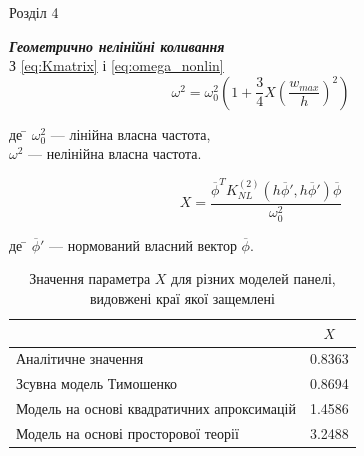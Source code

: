 \documentclass[8pt]{beamer}
\numberwithin{figure}{section}
\numberwithin{equation}{section}
\numberwithin{table}{section}
\begin{document}
\begin{frame}{Розділ 4}

\textbf{\textit{Геометрично нелінійні коливання}}
\\
\vspace{1em}
З \eqref{eq:Kmatrix} і \eqref{eq:omega_nonlin}
\begin{equation}
\omega^2=\omega_0^2\left(1+\frac{3}{4}X\left(\frac{w_{max}}{h}\right)^2\right)
\end{equation}

\begin{tabbing}
де \= $\omega_0^2$ --- лінійна власна частота,\\
\> $\omega^2$ --- нелінійна власна частота.
\end{tabbing}

\begin{equation}
X=\frac{\overline{\phi}^T K_{NL}^{(2)}\left( h\overline{\phi}',h\overline{\phi}' \right) \overline{\phi}}{\omega_0^2}
\end{equation}

\begin{tabbing}
де \= $\overline{\phi}'$ --- нормований власний вектор $\overline{\phi}$.
\end{tabbing}


%
\begin{table}[h!]
\caption{Значення параметра $X$ для різних моделей панелі, видовжені краї якої защемлені}
\centering
 \begin{tabular}{| l | c |} 
 \hline
 & $X$ \\ 
 \hline
 Аналітичне значення\footnotemark & 0.8363 \\ 
 \hline
 Зсувна модель Тимошенко & 0.8694 \\ 
 \hline
 Модель на основі квадратичних апроксимацій & 1.4586 \\ 
 \hline
 Модель на основі просторової теорії & 3.2488 \\
 \hline
\end{tabular}
\end{table}



\end{frame}
\end{document}
